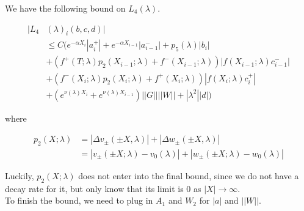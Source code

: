 \documentclass[12pt]{article}
\begin{document}
\begin{enumerate}
We have the following bound on $L_4(\lambda)$. 

\begin{align*}
|L_4&(\lambda)_i(b, c, d)|\\ 
&\leq C \Big( e^{-\alpha X_i} |a_i^+| +  e^{-\alpha X_{i-1}} |a_{i-1}^-| + p_5(\lambda) |b_i| \\
&+ (f^+(T; \lambda) p_2(X_{i-1}; \lambda) + f^-(X_{i-1}; \lambda)) |f(X_{i-1}; \lambda) c_{i-1}^-| \\
&+ (f^-(X_i; \lambda) p_2(X_i; \lambda) + f^+(X_i; \lambda)) | f(X_i; \lambda) c_i^+| \\
&+ (e^{\nu(\lambda)X_i} + e^{\nu(\lambda)X_{i-1}}) ||G|| ||W|| + |\lambda^2| |d| \Big)
\end{align*}

where

\begin{align*}
p_2(X; \lambda) &= |\Delta v_\pm(\pm X, \lambda)| + |\Delta w_\pm(\pm X, \lambda)|\\
&= |v_\pm(\pm X; \lambda) - v_0(\lambda)| + |w_\pm(\pm X; \lambda) - w_0(\lambda)|
\end{align*}

Luckily, $p_2(X; \lambda)$ does not enter into the final bound, since we do not have a decay rate for it, but only know that its limit is 0 as $|X| \rightarrow \infty$.\\

To finish the bound, we need to plug in $A_1$ and $W_2$ for $|a|$ and $||W||$.


\end{enumerate}
\end{document}
